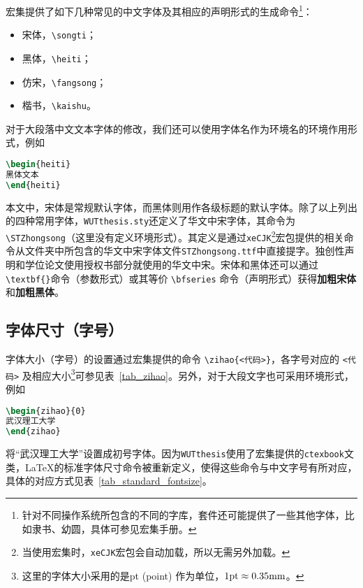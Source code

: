 \par {\CTeX}宏集提供了如下几种常见的中文字体及其相应的声明形式的生成命令\footnote{针对不同操作系统所包含的不同的字库，{\CTeX}套件还可能提供了一些其他字体，比如隶书、幼圆，具体可参见{\CTeX}宏集手册。}：
\begin{itemize}
\item {\songti 宋体}，\verb"\songti"；
\item {\heiti 黑体}，\verb"\heiti"；
\item {\fangsong 仿宋}，\verb"\fangsong"；
\item {\kaishu 楷书}，\verb"\kaishu"。
\end{itemize}
对于大段落中文文本字体的修改，我们还可以使用字体名作为环境名的环境作用形式，例如
\begin{lstlisting}[language=TeX]
\begin{heiti}
黑体文本
\end{heiti}
\end{lstlisting}
本文中，宋体是常规默认字体，而黑体则用作各级标题的默认字体。除了以上列出的四种常用字体，\texttt{WUTthesis.sty}还定义了华文中宋字体，其命令为 \verb"\STZhongsong"（{\heiti 这里没有定义环境形式}）。其定义是通过\texttt{xeCJK}\footnote{当使用{\CTeX}宏集时，\texttt{xeCJK}宏包会自动加载，所以无需另外加载。}宏包提供的相关命令从文件夹中所包含的华文中宋字体文件\texttt{STZhongsong.ttf}中直接提字。{\STZhongsong 独创性声明}和{\STZhongsong 学位论文使用授权书}部分就使用的华文中宋。宋体和{\heiti 黑体}还可以通过 \verb"\textbf{}"命令（参数形式）或其等价 \verb"\bfseries" 命令（声明形式）获得\textbf{加粗宋体}和\textbf{\heiti 加粗黑体}。









\subsection{字体尺寸（字号）}

\par 字体大小（字号）的设置通过{\CTeX}宏集提供的命令 \verb"\zihao{<代码>}"，各字号对应的 \verb"<代码>" 及相应大小\footnote{这里的字体大小采用的是pt (point) 作为单位，$1 {\rm pt}\approx 0.35 {\rm mm}$。}可参见表~\ref{tab_zihao}。另外，对于大段文字也可采用环境形式，例如
\begin{lstlisting}[language=TeX]
\begin{zihao}{0}
武汉理工大学
\end{zihao}
\end{lstlisting}
将“武汉理工大学”设置成初号字体。因为\texttt{WUTthesis}使用了{\CTeX}宏集提供的\texttt{ctexbook}文类，{\LaTeX}的标准字体尺寸命令被重新定义，使得这些命令与中文字号有所对应，具体的对应方式见表~\ref{tab_standard_fontsize}。


